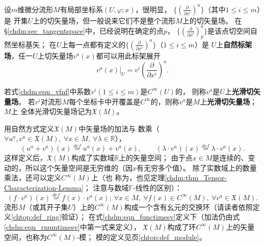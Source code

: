 设$m$维微分流形$M$有局部坐标系$(U,\varphi;x)$，很明显，
$\{(\frac{\partial }{\partial x^i})^a\}$（其中$1\leqslant i \leqslant m$）是
开集$U$上的切矢量场，但一般说来它们不是整个流形$M$上的切矢量场。
在\S\ref{chdm:sec_tangentspace}中，已经说明在确定的点$p$，
$\{(\frac{\partial }{\partial x^i})^a_p\}$是该点切空间自然坐标基矢；
在$U$上每一点都有定义的$\{(\frac{\partial }{\partial x^i})^a\}$（$1\leqslant i \leqslant m$）是
$U$上\textbf{自然标架场}，任一$U$上切矢量场$v^a(x)$都可以用此标架展开
\begin{equation}\label{chdm:eqn_vfnf}
    v^a(x)|_U = v^i \left(\frac{\partial }{\partial x^i}\right)^a .
\end{equation}


\begin{definition}
    若式\eqref{chdm:eqn_vfnf}中系数$v^i(1\leqslant i \leqslant m)$是$C^\infty(U)$的，
    则称$v^a$是$U$上\textbf{光滑切矢量场}。
    若$v^i$对流形$M$每个坐标卡中开覆盖是$C^\infty$的，则称$v^a$是$M$上\textbf{光滑切矢量场}；$M$上
    全体光滑切矢量场记为$\mathfrak{X}(M)$。
\end{definition}
用自然方式定义$\mathfrak{X}(M)$中矢量场的加法与
数乘（$\forall u^a,v^a \in \mathfrak{X}(M),\  \forall x\in M, \  \forall \lambda \in \mathbb{R}$），
\begin{equation}\label{chdm:eqn_rnumtimesv}
    (u^a+v^a)(x) \overset{def}{=} u^a(x) + v^a(x), \qquad 
    (\lambda \cdot v^a)(x) \overset{def}{=} \lambda\cdot v^a(x).
\end{equation}
这样定义后，$\mathfrak{X}(M)$构成了实数域$\mathbb{R}$上的矢量空间；
由于点$x\in M$是连续的、变动的，所以这个矢量空间是无穷维的（因$x$有无穷多个值）。
除了实数域上的数量乘法，还可以定义$C^\infty(M)$上（也
称为，也见定理\ref{chdm:thm_Tensor-Characterization-Lemma}；
注意与数域$\mathbb{F}$-线性的区别）：
\begin{equation}\label{chdm:eqn_functimesv}
    (f \cdot v^a)(x) \overset{def}{=} f(x)\cdot v^a(x); \
    \forall x\in M, \ \forall f(x) \in C^\infty(M), \ \forall v^a \in \mathfrak{X}(M) .
\end{equation}
流形$M$（或其开子集$U$）上的$C^\infty(M)$构成一个含有幺元的交换环（请读者依照定义\ref{chtop:def_ring}验证）；
在式\eqref{chdm:eqn_functimesv}定义下（加法仍由式\eqref{chdm:eqn_rnumtimesv}中第一式来定义），
$\mathfrak{X}(M)$构成了环$C^\infty(M)$上的矢量空间，也称为$C^\infty(M)$-模；
模的定义见\pageref{chtop:def_module}页\ref{chtop:def_module}。

